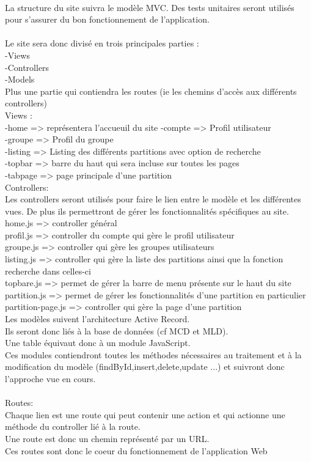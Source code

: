 \paragraph{}
La structure du site suivra le modèle MVC.
Des tests unitaires seront utilisés pour s'assurer du bon fonctionnement de l'application.
\\
\\
Le site sera donc divisé en trois principales parties : \\
-Views \\
-Controllers \\ 
-Models \\
Plus une partie qui contiendra les routes (ie les chemins d'accès aux différents controllers)
\\

Views : \\ 
-home => représentera l'accueuil du site
-compte => Profil utilisateur \\
-groupe => Profil du groupe \\
-listing => Listing des différents partitions avec option de recherche\\
-topbar => barre du haut qui sera incluse sur toutes les pages\\
-tabpage => page principale d'une partition\\

Controllers: \\
Les controllers seront utilisés pour faire le lien entre le modèle et les différentes vues. De plus ils permettront de gérer les fonctionnalités spécifiques au site. \\
home.js => controller général \\
profil.js => controller du compte qui gère le profil utilisateur\\
groupe.js => controller qui gère les groupes utilisateurs \\
listing.js => controller qui gère la liste des partitions ainsi que la fonction recherche dans celles-ci\\
topbare.js => permet de gérer la barre de menu présente sur le haut du site\\
partition.js  => permet de gérer les fonctionnalités d'une partition en particulier\\
partition-page.js => controller qui gère la page d'une partition\\

Les modèles suivent l'architecture Active Record. \\
Ils seront donc liés à la base de données (cf MCD et MLD). \\
Une table équivaut donc à un module JavaScript. \\
Ces modules contiendront toutes les méthodes nécessaires au traitement et à la modification du modèle (findById,insert,delete,update ...) et suivront donc l'approche vue en cours. \\
\\

Routes: \\
Chaque lien est une route qui peut contenir une action et qui actionne une méthode du controller lié à la route. \\
Une route est donc un chemin représenté par un URL. \\
Ces routes sont donc le coeur du fonctionnement de l'application Web\\

